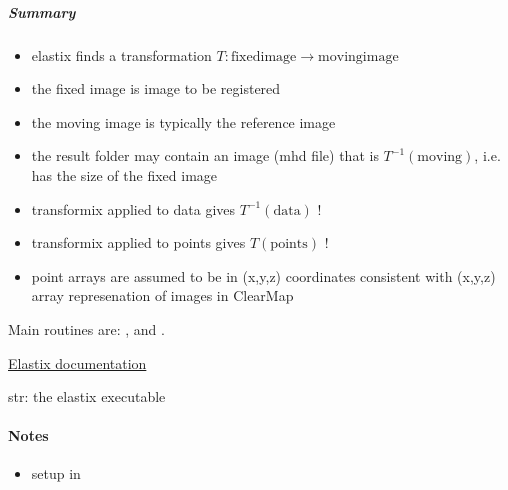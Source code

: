 \documentclass[letterpaper,10pt,english]{sphinxmanual}
\begin{document}
\subparagraph{Summary}
\label{api/ClearMap.Alignment:summary}\begin{itemize}
\item {} 
elastix finds a transformation $T: \mathrm{fixed image} \rightarrow \mathrm{moving image}$

\item {} 
the fixed image is image to be registered

\item {} 
the moving image is typically the reference image

\item {} 
the result folder may contain an image (mhd file) that is $T^{-1}(\mathrm{moving})$,
i.e. has the size of the fixed image

\item {} 
transformix applied to data gives $T^{-1}(\mathrm{data})$ !

\item {} 
transformix applied to points gives $T(\mathrm{points})$ !

\item {} 
point arrays are assumed to be in (x,y,z) coordinates consistent with (x,y,z) array represenation of images in ClearMap

\end{itemize}

Main routines are: {\hyperref[api/ClearMap.Alignment:ClearMap.Alignment.Elastix.alignData]{\emph{}}}, {\hyperref[api/ClearMap.Alignment:ClearMap.Alignment.Elastix.transformData]{\emph{}}} and {\hyperref[api/ClearMap.Alignment:ClearMap.Alignment.Elastix.transformPoints]{\emph{}}}.




\href{http://elastix.isi.uu.nl/}{Elastix documentation}
{\hyperref[api/ClearMap.Alignment:module-ClearMap.Alignment.Resampling]{\emph{}}}



\begin{fulllineitems}
\label{api/ClearMap.Alignment:ClearMap.Alignment.Elastix.ElastixBinary}
str: the elastix executable
\paragraph{Notes}
\begin{itemize}
\item {} 
setup in {\hyperref[api/ClearMap.Alignment:ClearMap.Alignment.Elastix.initializeElastix]{\emph{}}}

\end{itemize}

\end{fulllineitems}
\end{document}

